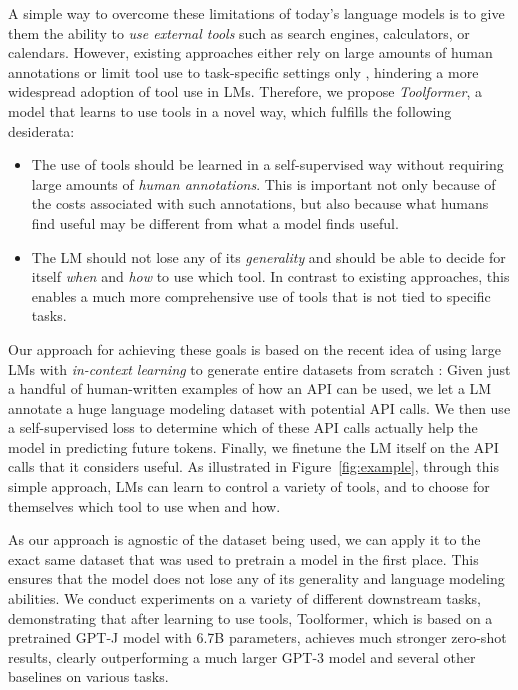 \documentclass[11pt]{article}
\newcommand{\ours}[0]{Toolformer}
\begin{document}
\begin{CJK*}{UTF8}{gbsn}
A simple way to overcome these limitations of today's language models is to give them the ability to \emph{use external tools} such as search engines, calculators, or calendars.
However, existing approaches either rely on large amounts of human annotations \citep{komeili-etal-2022-internet,thoppilan2022lamda} or limit tool use to task-specific settings only \citep[e.g.,][]{gao2022pal,parisi2022talm}, hindering a more widespread adoption of tool use in LMs.
Therefore, we propose \emph{\ours{}}, a model that learns to use tools in a novel way, which fulfills the following desiderata:
\begin{itemize}
    \item The use of tools should be learned in a self-supervised way without requiring large amounts of \emph{human annotations}. This is important not only because of the costs associated with such annotations, but also because what humans find useful may be different from what a model finds useful.
    \item The LM should not lose any of its \emph{generality} and should be able to decide for itself \emph{when} and \emph{how} to use which tool. In contrast to existing approaches, this enables a much more comprehensive use of tools that is not tied to specific tasks.
\end{itemize}

Our approach for achieving these goals is based on the recent idea of using large LMs with \emph{in-context learning} \citep{brown2020language} to generate entire datasets from scratch \citep{schick-schutze-2021-generating,honovich2022unnatural,wang2022selfinstruct}: Given just a handful of human-written examples of how an API can be used, we let a LM annotate a huge language modeling dataset with potential API calls. We then use a self-supervised loss to determine which of these API calls actually help the model in predicting future tokens. Finally, we finetune the LM itself on the API calls that it considers useful. As illustrated in Figure~\ref{fig:example}, through this simple approach, LMs can learn to control a variety of tools, and to choose for themselves which tool to use when and how. 

As our approach is agnostic of the dataset being used, we can apply it to the exact same dataset that was used to pretrain a model in the first place. This ensures that the model does not lose any of its generality and language modeling abilities. We conduct experiments on a variety of different downstream tasks, demonstrating that after learning to use tools, \ours{}, which is based on a pretrained GPT-J model \citep{gpt-j} with 6.7B parameters, achieves much stronger zero-shot results, clearly outperforming a much larger GPT-3 model \citep{brown2020language} and several other baselines on various tasks.


\end{CJK*}
\end{document}
